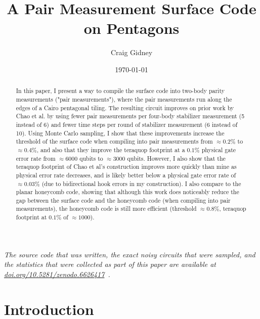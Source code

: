 \documentclass[onecolumn,unpublished,a4paper]{quantumarticle}
\theoremstyle{definition}
\theoremstyle{definition}
\theoremstyle{definition}
\begin{document}
\title{A Pair Measurement Surface Code on Pentagons}

\date{\today}
\author{Craig Gidney}

\begin{abstract}
In this paper, I present a way to compile the surface code into two-body parity measurements ("pair measurements"), where the pair measurements run along the edges of a Cairo pentagonal tiling.
The resulting circuit improves on prior work by Chao et al. by using fewer pair measurements per four-body stabilizer measurement (5 instead of 6) and fewer time steps per round of stabilizer measurement (6 instead of 10).
Using Monte Carlo sampling, I show that these improvements increase the threshold of the surface code when compiling into pair measurements from $\approx 0.2\%$ to $\approx 0.4\%$, and also that they improve the teraquop footprint at a $0.1\%$ physical gate error rate from $\approx6000$ qubits to $\approx3000$ qubits.
However, I also show that the teraquop footprint of Chao et al's construction improves more quickly than mine as physical error rate decreases, and is likely better below a physical gate error rate of $\approx 0.03\%$ (due to bidirectional hook errors in my construction).
I also compare to the planar honeycomb code, showing that although this work does noticeably reduce the gap between the surface code and the honeycomb code (when compiling into pair measurements), the honeycomb code is still more efficient (threshold $\approx 0.8\%$, teraquop footprint at $0.1\%$ of $\approx 1000$).
\end{abstract}

\maketitle

\emph{The source code that was written, the exact noisy circuits that were sampled, and the statistics that were collected as part of this paper are available at \href{https://doi.org/10.5281/zenodo.6626417}{doi.org/10.5281/zenodo.6626417}~\cite{craig_gidney_2022_6626417}.}

\section{Introduction}
\label{sec:introduction}
\end{document}
